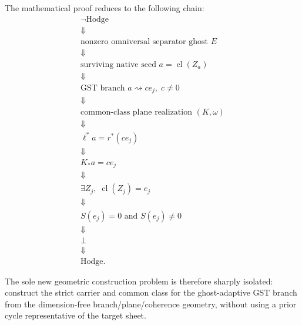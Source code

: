 \documentclass[11pt]{article}
\newcommand{\cl}{\operatorname{cl}}
\begin{document}
The mathematical proof reduces to the following chain:
\[
\boxed{
\begin{array}{c}
\neg\mathrm{Hodge}\\
\Downarrow\\
\text{nonzero omniversal separator ghost }E\\
\Downarrow\\
\text{surviving native seed }a=\cl(Z_a)\\
\Downarrow\\
\text{GST branch }a\rightsquigarrow c e_j,\;c\ne0\\
\Downarrow\\
\text{common-class plane realization }(K,\omega)\\
\Downarrow\\
\ell^*a=r^*(c e_j)\\
\Downarrow\\
K_*a=c e_j\\
\Downarrow\\
\exists Z_j,\;\cl(Z_j)=e_j\\
\Downarrow\\
S(e_j)=0\text{ and }S(e_j)\ne0\\
\Downarrow\\
\bot\\
\Downarrow\\
\mathrm{Hodge}.
\end{array}}
\]

The sole new geometric construction problem is therefore sharply isolated:
construct the strict carrier and common class for the ghost-adaptive GST branch
from the dimension-free branch/plane/coherence geometry, without using a prior
cycle representative of the target sheet.
\end{document}
